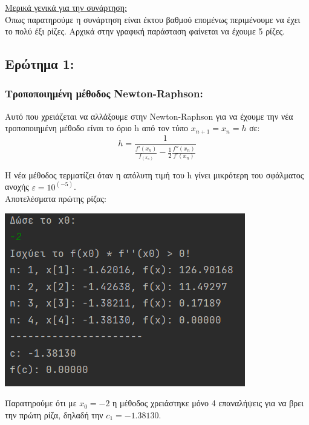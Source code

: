 \documentclass{article}
\begin{document}
\vspace{5mm} 
\large{\underline{Μερικά γενικά για την συνάρτηση: }} \\
Όπως παρατηρούμε η συνάρτηση είναι έκτου βαθμού επομένως περιμένουμε να έχει το πολύ έξι ρίζες. Αρχικά στην γραφική παράσταση φαίνεται να έχουμε 5 ρίζες.

\subsection{Ερώτημα 1:}
    \subsubsection{Τροποποιημένη μέθοδος Newton-Raphson:}
    Αυτό που χρειάζεται να αλλάξουμε στην Newton-Raphson για να έχουμε την νέα τροποποιημένη μέθοδο είναι το όριο h από τον τύπο \(x_{n+1} = x_n = h\) σε: \\
    
    \[h = \frac{1}{\frac{f'(x_n)}{f_(x_n)} - \frac{1}{2}\frac{f''(x_n)}{f'(x_n)}}\]
    
    Η νέα μέθοδος τερματίζει όταν η απόλυτη τιμή του h γίνει μικρότερη του σφάλματος ανοχής \(ε = 10^{(-5)}\). \\
    
    Αποτελέσματα πρώτης ρίζας: \\
    \begin{center}\includegraphics[]{images/results_8.png}\end{center}
    Παρατηρούμε ότι με \(x_0 = -2\) η μέθοδος χρειάστηκε μόνο 4 επαναλήψεις για να βρει την πρώτη ρίζα, δηλαδή την \(c_1 = -1.38130\). 
    
\end{document}

